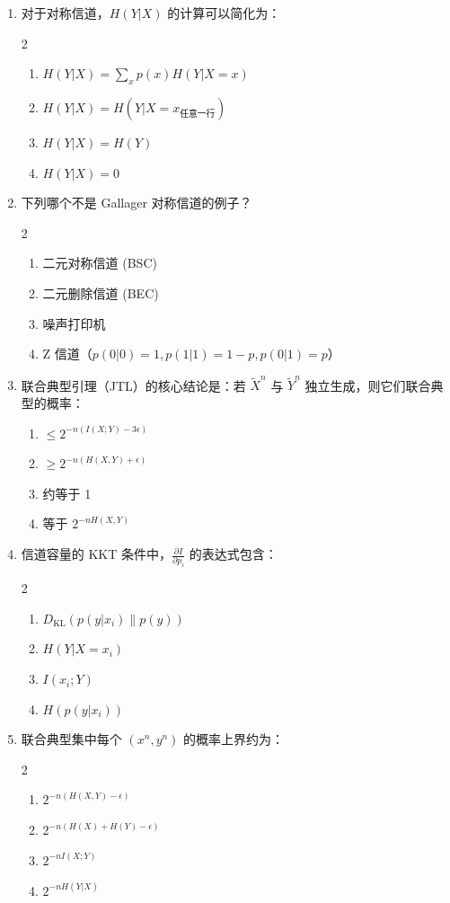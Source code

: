 \documentclass[12pt,a4paper]{ctexart}
\newcommand{\DKL}{D_{\mathrm{KL}}}
\begin{document}
\begin{enumerate}[label=\arabic*., leftmargin=*]
\item 对于对称信道，$H(Y|X)$ 的计算可以简化为：
\begin{multicols}{2}
\begin{enumerate}[label=(\Alph*)]
  \item $H(Y|X) = \sum_x p(x) H(Y|X=x)$
  \item $H(Y|X) = H(Y|X=x_{\text{任意一行}})$
  \item $H(Y|X) = H(Y)$
  \item $H(Y|X) = 0$
\end{enumerate}
\end{multicols}

\item 下列哪个不是 Gallager 对称信道的例子？
\begin{multicols}{2}
\begin{enumerate}[label=(\Alph*)]
  \item 二元对称信道 (BSC)
  \item 二元删除信道 (BEC)
  \item 噪声打印机
  \item Z 信道（$p(0|0)=1, p(1|1)=1-p, p(0|1)=p$）
\end{enumerate}
\end{multicols}

\item 联合典型引理（JTL）的核心结论是：若 $\tilde{X}^n$ 与 $\tilde{Y}^n$ 独立生成，则它们联合典型的概率：
\begin{enumerate}[label=(\Alph*)]
  \item $\leq 2^{-n(I(X;Y)-3\epsilon)}$
  \item $\geq 2^{-n(H(X,Y)+\epsilon)}$
  \item 约等于 1
  \item 等于 $2^{-nH(X,Y)}$
\end{enumerate}

\item 信道容量的 KKT 条件中，$\frac{\partial I}{\partial p_i}$ 的表达式包含：
\begin{multicols}{2}
\begin{enumerate}[label=(\Alph*)]
  \item $\DKL(p(y|x_i) \| p(y))$
  \item $H(Y|X=x_i)$
  \item $I(x_i; Y)$
  \item $H(p(y|x_i))$
\end{enumerate}
\end{multicols}

\item 联合典型集中每个 $(x^n,y^n)$ 的概率上界约为：
\begin{multicols}{2}
\begin{enumerate}[label=(\Alph*)]
  \item $2^{-n(H(X,Y)-\epsilon)}$
  \item $2^{-n(H(X)+H(Y)-\epsilon)}$
  \item $2^{-nI(X;Y)}$
  \item $2^{-nH(Y|X)}$
\end{enumerate}
\end{multicols}

\end{enumerate}
\end{document}

